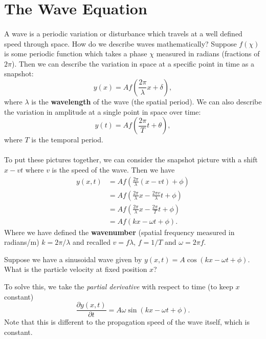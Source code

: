 \documentclass[../classical_mechanics.tex]{subfiles}
\begin{document}
    \section{The Wave Equation}
        \paragraph{}
        A wave is a periodic variation or disturbance which travels at a well defined speed through space.
        How do we describe waves mathematically?
        Suppose $f(\chi)$ is some periodic function which takes a phase $\chi$ measured in radians (fractions of $2\pi$).
        Then we can describe the variation in space at a specific point in time as a snapshot:
        \begin{equation}
            y(x) = A f\left(\frac{2\pi}{\lambda}x+\delta\right),
        \end{equation}
        where $\lambda$ is the \textbf{wavelength} of the wave (the spatial period).
        We can also describe the variation in amplitude at a single point in space over time:
        \begin{equation}
            y(t)=A f\left(\frac{2\pi}{T}t+\theta\right),
        \end{equation}
        where $T$ is the temporal period.

        \paragraph{}
        To put these pictures together, we can consider the snapshot picture with a shift $x-vt$ where $v$ is the speed of the wave.
        Then we have
        \begin{align}
            y(x, t) &= A f\left(\frac{2\pi}{\lambda}(x-vt) + \phi\right)\\
            &= A f\left(\frac{2\pi}{\lambda}x - \frac{2\pi v}{\lambda}t + \phi\right)\\
            &= A f\left(\frac{2\pi}{\lambda}x - \frac{2\pi}{T}t + \phi\right)\\
            &= A f(kx - \omega t + \phi).
        \end{align} 
        Where we have defined the \textbf{wavenumber} (spatial frequency measured in radians/m) $k=2\pi/\lambda$ and recalled $v=f\lambda$, $f=1/T$ and $\omega=2\pi f$.
        \begin{example}
            Suppose we have a sinusoidal wave given by $y(x, t)=A\cos(kx-\omega t+\phi)$.
            What is the particle velocity at fixed position $x$?

            To solve this, we take the \textit{partial derivative} with respect to time (to keep $x$ constant)
            \begin{equation}
                \frac{\partial y(x, t)}{\partial t}=A\omega\sin(kx-\omega t+\phi).
            \end{equation}
            Note that this is different to the propagation speed of the wave itself, which is constant.
        \end{example}
\end{document}
